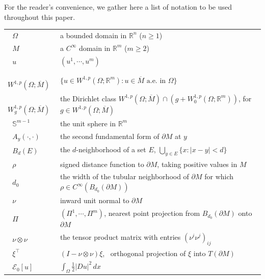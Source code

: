 \documentclass[11pt]{amsart}
\newcommand{\R}{{\mathbb R}}
\newcommand{\cE}{{\mathcal E}}
\def \mb{\mathbb}
\newcommand{\dist}{\operatorname{dist}}
\theoremstyle{plain}
\theoremstyle{definition}
\theoremstyle{remark}
\numberwithin{equation}{section}
\begin{document}
For the reader's convenience, we gather here a list of notation to be used throughout this paper.


\begin{longtable}[l]{l l }
\,\,\,\,$\Omega$ &\qquad  a bounded domain in $\R^n$ ($n\geq 1$)  \medskip \\ 
\,\,\,\,$M$  &\qquad a $C^\infty $ domain in $\R^m$  ($m\geq 2$)  \medskip \\ 
\,\,\,\,$u$  &\qquad $(u^1, \cdots , u^m)$    \medskip \\
\,\,\,\,$W^{1,p}(\Omega;\overline M)$&\qquad $\{u\in W^{1,p}(\Omega;\R^m): u\in \overline M\text{ a.e.\ in }\Omega\}$      \medskip \\
\,\,\,\,$W^{1,p}_g(\Omega;\overline M)$&\qquad  the Dirichlet class $W^{1,p}(\Omega;\overline M)\cap (g+W^{1,p}_0(\Omega;\R^m))$, for $g\in W^{1,p}(\Omega;\overline M)$   \medskip \\
\,\,\,\,$\mb S^{m-1}$  &\qquad the unit sphere in $\R^m$ \medskip \\ 
\,\,\,\,$A_y (\cdot , \cdot)$  &\qquad     the second fundamental form of $\partial M$ at $y$   \medskip \\   
\,\,\,\,$B_d(E)$  &\qquad   the $d$-neighborhood of a set $E$, $\bigcup_{y\in E}\{x : |x-y| < d\}$
    \medskip\\  
\,\,\,\,$\rho$  &\qquad   signed distance function to $\partial M$, taking positive values in $M$   \medskip \\ 
 \,\,\,\,$d_0$  &\qquad   the width of the tubular neighborhood of $\partial M$ for which $\rho\in C^\infty(B_{d_0}(\partial M))$\medskip \\ 
\,\,\,\,$\nu$  &\qquad inward unit normal to $\partial M$ \medskip \\   
\,\,\,\,$\Pi$   &\qquad   $(\Pi^1, \cdots , \Pi^m)$, nearest point projection from $B_{d_0}(\partial M)$ onto $\partial M$
       \medskip\\ 
\,\,\,\,$\nu\otimes \nu$   &\qquad        the tensor product matrix with entries $(\nu^i\nu^j)_{ij}$ \medskip\\   
\,\,\,\,$\xi^\top$  &\qquad   $
  (I - \nu\otimes \nu)\xi
$,   \ orthogonal projection of $\xi$ into $T(\partial M)$      \medskip \\ 
\,\,\,\,$\cE_0[u]$  &\qquad $\int_\Omega \frac{1}{2}|Du|^2 \, dx$   \medskip \\ 

\end{longtable}
\end{document}
